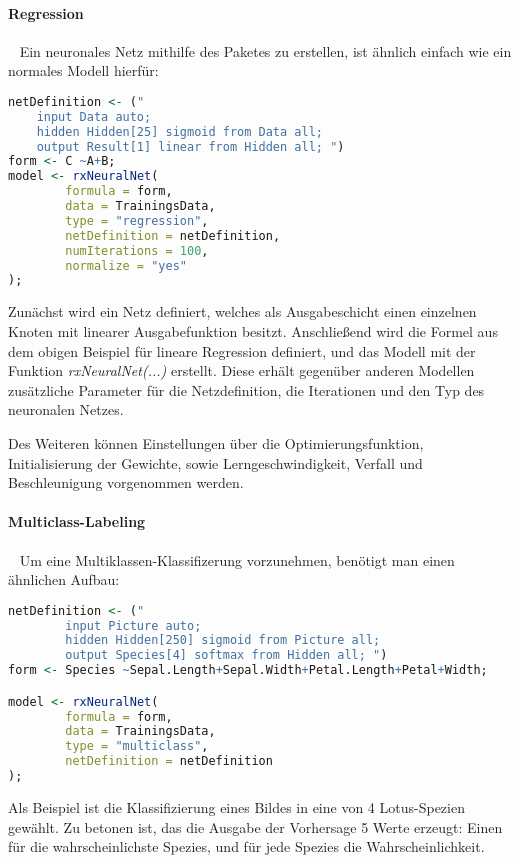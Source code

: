 \paragraph{Regression} ~\newline
Ein neuronales Netz mithilfe des Paketes zu erstellen, ist ähnlich einfach wie ein normales Modell hierfür:

\begin{lstlisting}[language=R]
netDefinition <- ("
	input Data auto;
	hidden Hidden[25] sigmoid from Data all;
	output Result[1] linear from Hidden all; ")
form <- C ~A+B;
model <- rxNeuralNet(
		formula = form, 
		data = TrainingsData,              
		type = "regression",
		netDefinition = netDefinition,
		numIterations = 100,
		normalize = "yes"
);
\end{lstlisting}

Zunächst wird ein Netz definiert, welches als Ausgabeschicht einen einzelnen Knoten mit linearer Ausgabefunktion besitzt. Anschließend wird die Formel aus dem obigen Beispiel für lineare Regression definiert, und das Modell mit der Funktion \textit{rxNeuralNet(...)} erstellt. Diese erhält gegenüber anderen Modellen zusätzliche Parameter für die Netzdefinition, die Iterationen und den Typ des neuronalen Netzes. 

Des Weiteren können Einstellungen über die Optimierungsfunktion, Initialisierung der Gewichte, sowie Lerngeschwindigkeit, Verfall und Beschleunigung vorgenommen werden.

\paragraph{Multiclass-Labeling} ~\newline
Um eine Multiklassen-Klassifizerung vorzunehmen, benötigt man einen ähnlichen Aufbau:


\begin{lstlisting}[language=R]
netDefinition <- ("
		input Picture auto;
		hidden Hidden[250] sigmoid from Picture all;
		output Species[4] softmax from Hidden all; ")
form <- Species ~Sepal.Length+Sepal.Width+Petal.Length+Petal+Width;

model <- rxNeuralNet(
		formula = form, 
		data = TrainingsData,              
		type = "multiclass",
		netDefinition = netDefinition
);
\end{lstlisting}

Als Beispiel ist die Klassifizierung eines Bildes in eine von 4 Lotus-Spezien gewählt. Zu betonen ist, das die Ausgabe der Vorhersage 5 Werte erzeugt: Einen für die wahrscheinlichste Spezies, und für jede Spezies die Wahrscheinlichkeit.